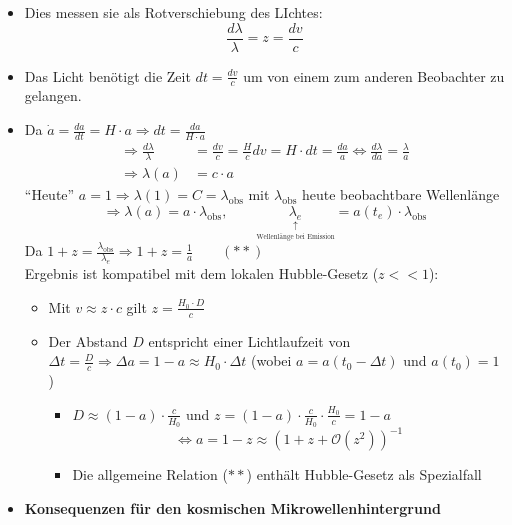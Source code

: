 \begin{itemize}
	\item Dies messen sie als Rotverschiebung des LIchtes:
		\begin{equation*}
			\frac{d\lambda}{\lambda}=z=\frac{dv}{c}
		\end{equation*}
	\item Das Licht benötigt die Zeit $dt=\frac{dv}{c}$ um von einem zum anderen Beobachter zu gelangen.
	\item Da $\dot{a}=\frac{da}{dt}=H\cdot a\Rightarrow dt=\frac{da}{H\cdot a}$
		\begin{align*}
			\Rightarrow \frac{d\lambda}{\lambda}&=\frac{dv}{c}=\frac{H}{c}dv=H\cdot dt=\frac{da}{a}\Leftrightarrow \frac{d\lambda}{da}=\frac{\lambda}{a}\\
			\Rightarrow \lambda(a)&=c\cdot a
		\end{align*}
		"`Heute"' $a=1\Rightarrow \lambda(1)=C=\lambda_\text{obs}$ mit $\lambda_\text{obs}$ heute beobachtbare Wellenlänge
		\begin{equation*}
			\Rightarrow \lambda(a)=a\cdot\lambda_\text{obs},\qquad\underset{\underset{\text{Wellenlänge bei Emission}}{\uparrow}}{\lambda_e}=a(t_e)\cdot\lambda_\text{obs}
		\end{equation*}
		Da $1+z=\frac{\lambda_\text{obs}}{\lambda_e}\Rightarrow 1+z=\frac{1}{a} \qquad (\ast\ast)$\\
		Ergebnis ist kompatibel mit dem lokalen Hubble-Gesetz ($z<<1$):
		\begin{itemize}[label={\textbullet}]
			\item Mit $v\approx z\cdot c$ gilt $z=\frac{H_0\cdot D}{c}$
			\item Der Abstand $D$ entspricht einer Lichtlaufzeit von $\Delta t=\frac{D}{c}\Rightarrow \Delta a=1-a\approx H_0\cdot\Delta t$ (wobei $a=a(t_0-\Delta t)$ und $a(t_0)=1$)
				\begin{itemize}[label={$\Rightarrow$}]
					\item $D\approx (1-a)\cdot\frac{c}{H_0}$ und $z=(1-a)\cdot\frac{c}{H_0}\cdot\frac{H_0}{c}=1-a$
						\begin{equation*}
							\Leftrightarrow a=1-z\approx \left(1+z+\mathcal{O}\left(z^2\right)\right)^{-1}
						\end{equation*}
					\item Die allgemeine Relation ($\ast\ast$) enthält Hubble-Gesetz als Spezialfall
				\end{itemize}
		\end{itemize}
	\item \textbf{Konsequenzen für den kosmischen Mikrowellenhintergrund}

\end{itemize}
